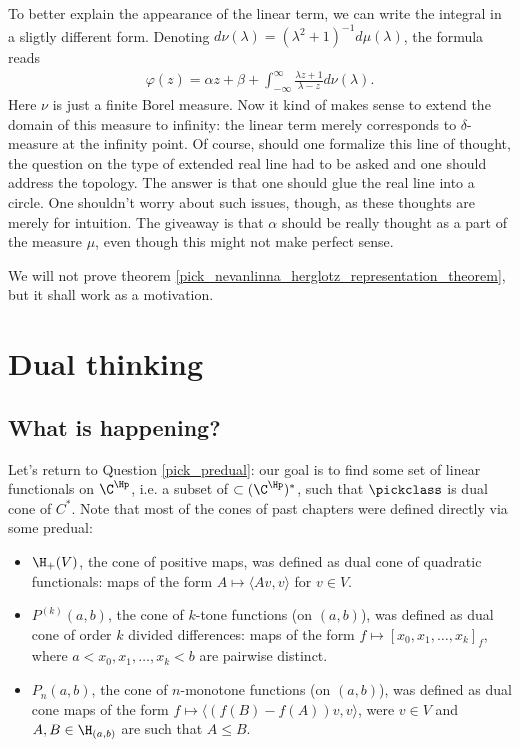 To better explain the appearance of the linear term, we can write the integral in a sligtly different form. Denoting $d \nu(\lambda) = (\lambda^2 + 1)^{-1} d \mu(\lambda)$, the formula reads
\begin{align*}
	\varphi(z) = \alpha z + \beta + \int_{-\infty}^{\infty} \frac{\lambda z + 1}{\lambda - z} d \nu(\lambda).
\end{align*}
Here $\nu$ is just a finite Borel measure. Now it kind of makes sense to extend the domain of this measure to infinity: the linear term merely corresponds to $\delta$-measure at the infinity point. Of course, should one formalize this line of thought, the question on the type of extended real line had to be asked and one should address the topology. The answer is that one should glue the real line into a circle. One shouldn't worry about such issues, though, as these thoughts are merely for intuition. The giveaway is that $\alpha$ should be really thought as a part of the measure $\mu$, even though this might not make perfect sense.

We will not prove theorem \ref{pick_nevanlinna_herglotz_representation_theorem}, but it shall work as a motivation.

\section{Dual thinking}

\subsection{What is happening?}

Let's return to Question \ref{pick_predual}: our goal is to find some set of linear functionals on $\C^{\Hp}$, i.e. a subset of $\subset (\C^{\Hp})^{*}$, such that $\pickclass$ is dual cone of $C^{*}$. Note that most of the cones of past chapters were defined directly via some predual:

\begin{itemize}
	\item $\H_{+}(V)$, the cone of positive maps, was defined as dual cone of quadratic functionals: maps of the form $A \mapsto \langle A v, v \rangle$ for $v \in V$.
	\item $P^{(k)}(a, b)$, the cone of $k$-tone functions (on $(a, b)$), was defined as dual cone of order $k$ divided differences: maps of the form $f \mapsto [x_{0}, x_{1}, \ldots, x_{k}]_{f}$, where $a < x_{0}, x_{1}, \ldots, x_{k} < b$ are pairwise distinct.
	\item $P_{n}(a, b)$, the cone of $n$-monotone functions (on $(a, b)$), was defined as dual cone maps of the form $f \mapsto \langle (f(B) - f(A)) v, v \rangle$, were $v \in V$ and $A, B \in \H_{(a, b)}$ are such that $A \leq B$.
\end{itemize}

